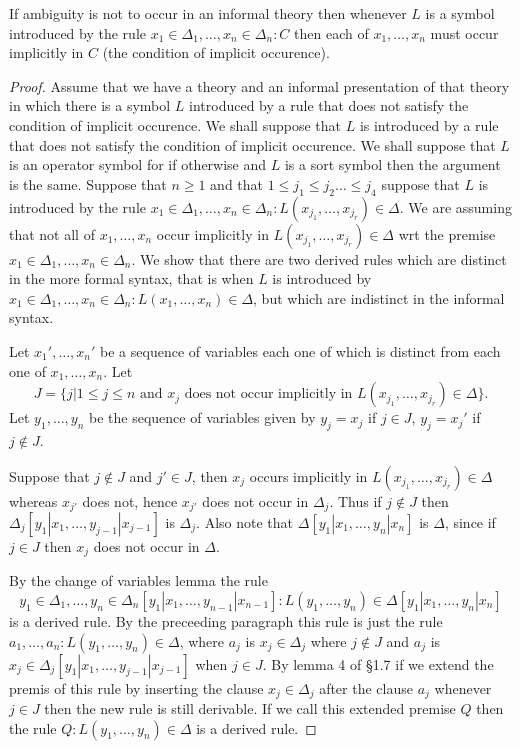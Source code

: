 \begin{lemma} 
If ambiguity is not to occur in an informal theory then whenever $L$ is a symbol introduced by the rule $x_1\in\Delta_1,\ldots,x_n\in\Delta_n:C$ then each of $x_1,\ldots,x_n$ must occur implicitly in $C$ (the condition of implicit occurence).
\end{lemma}
\begin{proof}
  Assume that we have a theory and an informal presentation of that theory in which there is a symbol $L$ introduced by a rule that does not satisfy the condition of implicit occurence.
  We shall suppose that $L$ is introduced by a rule that does not satisfy the condition of implicit occurence.
  We shall suppose that $L$ is an operator symbol for if otherwise and $L$ is a sort symbol then the argument is the same.
  Suppose that $n\geq 1$ and that $1\leq j_1\leq j_2\ldots\leq j_4$ suppose that $L$ is introduced by the rule $x_1\in\Delta_1,\ldots,x_n\in\Delta_n:L(x_{j_1},\ldots,x_{j_r})\in\Delta$.
  We are assuming that not all of $x_1,\ldots,x_n$ occur implicitly in $L(x_{j_1},\ldots,x_{j_r})\in\Delta$ wrt the premise $x_1\in\Delta_1,\ldots,x_n\in\Delta_n$.
  We show that there are two derived rules which are distinct in the more formal syntax, that is when $L$ is introduced by $x_1\in\Delta_1,\ldots,x_n\in\Delta_n:L(x_1,\ldots,x_n)\in\Delta$, but which are indistinct in the informal syntax.

  Let $x_1',\ldots,x_n'$ be a sequence of variables each one of which is distinct from each one of $x_1,\ldots,x_n$.
  Let 
  \[J=\{j|1\leq j\leq n \text{ and $x_j$ does not occur implicitly in $L(x_{j_1},\ldots,x_{j_r})\in\Delta$}\}.\]
% 
Let $y_1,\ldots, y_n$ be the sequence of variables given by $y_j=x_j$ if $j\in J$, $y_j=x_j'$ if $j\not\in J$.

  Suppose that $j\not\in J$ and $j'\in J$, then $x_j$ occurs implicitly in $L(x_{j_1},\ldots,x_{j_r})\in\Delta$ whereas $x_{j'}$ does not, hence $x_{j'}$ does not occur in $\Delta_j$.
%
 Thus if $j\not\in J$ then $\Delta_j[y_1|x_1,\ldots,y_{j-1}|x_{j-1}]$ is $\Delta_j$.
%
 Also note that $\Delta[y_1|x_1,\ldots,y_n|x_n]$ is $\Delta$, since if $j\in J$ then $x_j$ does not occur in $\Delta$.

  By the change of variables lemma the rule 
\[y_1\in\Delta_1,\ldots,y_n\in\Delta_n[y_1|x_1,\ldots,y_{n-1}|x_{n-1}] : L(y_1,\ldots,y_n) \in\Delta[y_1|x_1,\ldots, y_n|x_n]\] is a derived rule.
%
 By the preceeding paragraph this rule is just the rule $a_1,\ldots,a_n:L(y_1,\ldots,y_n)\in\Delta$, where $a_j$ is $x_j\in\Delta_j$ where $j\not\in J$ and $a_j$ is $x_j\in\Delta_j[y_1|x_1,\ldots,y_{j-1}|x_{j-1}]$ when $j\in J$.
%
 By lemma 4 of \S 1.7 if we extend the premis of this rule by inserting the clause $x_j\in\Delta_j$ after the clause $a_j$ whenever $j\in J$ then the new rule is still derivable.
%
 If we call this extended premise $Q$ then the rule $Q:L(y_1,\ldots,y_n)\in\Delta$ is a derived rule.


\end{proof}
